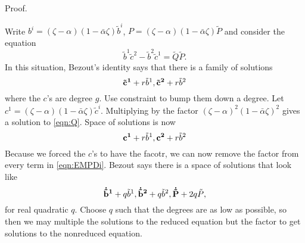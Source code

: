 Proof.

Write $b^i = (ζ-α)(1-\bar{α}ζ) \tilde b^i$, $P = (ζ-α)(1-\bar{α}ζ) \tilde P$ and consider the equation
\[
\tilde b^1 \tilde c^2 - \tilde b^2 \tilde c^1 = \tilde Q \tilde P.
\]
In this situation, Bezout's identity says that there is a family of solutions
\[
{\bf \tilde c^1} + r \tilde b^1, {\bf \tilde c^2} + r \tilde b^2
\]
where the $c$'s are degree $g$. Use constraint to bump them down a degree. Let $c^1 = (ζ-α)(1-\bar{α}ζ) \tilde c^i$. Multiplying by the factor $(ζ-α)^2(1-\bar{α}ζ)^2$ gives a solution to \eqref{eqn:Q}. Space of solutions is now
\[
{\bf c^1} + r \tilde b^1, {\bf c^2} + r \tilde b^2
\]
Because we forced the $c$'s to have the facotr, we can now remove the factor from every term in \eqref{eqn:EMPDi}. Bezout says there is a space of solutions that look like
\[
{\bf\dot {\tilde b}^1} + q \tilde b^1, {\bf\dot {\tilde b}^2} + q \tilde b^2, {\bf\dot{\tilde P}} + 2q \tilde P,
\]
for real quadratic $q$. Choose $q$ such that the degrees are as low as possible, so then we may multiple the solutions to the reduced equation but the factor to get solutions to the nonreduced equation.
